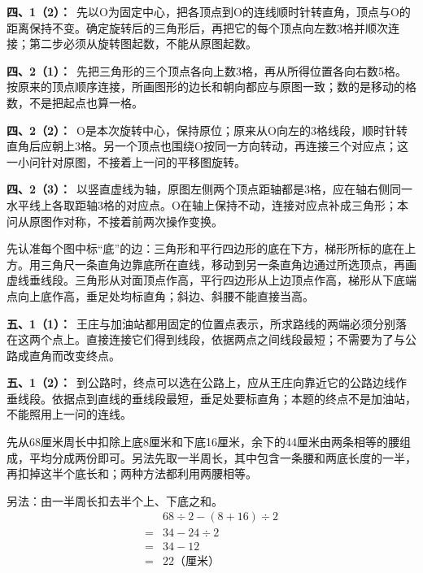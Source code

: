 \documentclass[multi=snippet,border=0pt]{standalone}
\newenvironment{snippet}[3]{\begin{minipage}{#1bp}\color{answerred}\fontsize{#2}{#3}\selectfont\raggedright}{\end{minipage}}
\begin{document}
\begin{snippet}{505}{11.5}{14}\textbf{四、1（2）：}\ 先以O为固定中心，把各顶点到O的连线顺时针转直角，顶点与O的距离保持不变。确定旋转后的三角形后，再把它的每个顶点向左数3格并顺次连接；第二步必须从旋转图起数，不能从原图起数。\end{snippet}
\begin{snippet}{505}{11.5}{14}\textbf{四、2（1）：}\ 先把三角形的三个顶点各向上数3格，再从所得位置各向右数5格。按原来的顶点顺序连接，所画图形的边长和朝向都应与原图一致；数的是移动的格数，不是把起点也算一格。\end{snippet}
\begin{snippet}{505}{11.5}{14}\textbf{四、2（2）：}\ O是本次旋转中心，保持原位；原来从O向左的3格线段，顺时针转直角后应朝上3格。另一个顶点也围绕O按同一方向转动，再连接三个对应点；这一小问针对原图，不接着上一问的平移图旋转。\end{snippet}
\begin{snippet}{505}{11.5}{14}\textbf{四、2（3）：}\ 以竖直虚线为轴，原图左侧两个顶点距轴都是3格，应在轴右侧同一水平线上各取距轴3格的对应点。O在轴上保持不动，连接对应点补成三角形；本问从原图作对称，不接着前两次操作变换。\end{snippet}
\begin{snippet}{505}{11.5}{14}先认准每个图中标“底”的边：三角形和平行四边形的底在下方，梯形所标的底在上方。用三角尺一条直角边靠底所在直线，移动到另一条直角边通过所选顶点，再画虚线垂线段。三角形从对面顶点作高，平行四边形从上边顶点作高，梯形从下底端点向上底作高，垂足处均标直角；斜边、斜腰不能直接当高。\end{snippet}
\begin{snippet}{505}{11.5}{14}\textbf{五、1（1）：}\ 王庄与加油站都用固定的位置点表示，所求路线的两端必须分别落在这两个点上。直接连接它们得到线段，依据两点之间线段最短；不需要为了与公路成直角而改变终点。\end{snippet}
\begin{snippet}{505}{11.5}{14}\textbf{五、1（2）：}\ 到公路时，终点可以选在公路上，应从王庄向靠近它的公路边线作垂线段。依据点到直线的垂线段最短，垂足处要标直角；本题的终点不是加油站，不能照用上一问的连线。\end{snippet}
\begin{snippet}{505}{11.5}{14}先从68厘米周长中扣除上底8厘米和下底16厘米，余下的44厘米由两条相等的腰组成，平均分成两份即可。另法先取一半周长，其中包含一条腰和两底长度的一半，再扣掉这半个底长和；两种方法都利用两腰相等。\par 另法：由一半周长扣去半个上、下底之和。\[\begin{aligned}&68\div2-(8+16)\div2\\={}&34-24\div2\\={}&34-12\\={}&22\text{（厘米）}\end{aligned}\]\end{snippet}
\end{document}
